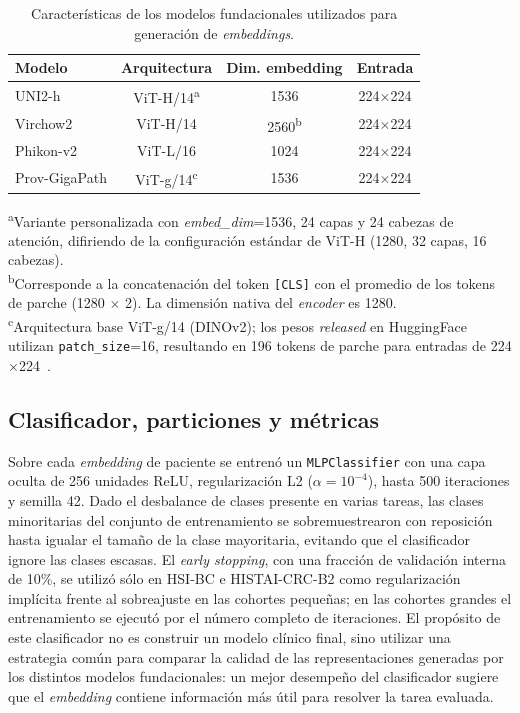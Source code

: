 \begin{table}[h]
\centering
\caption{Características de los modelos fundacionales utilizados para generación de \textit{embeddings}.}
\label{tab:embedding_models}
\begin{tabular}{lccc}
\hline
\textbf{Modelo} & \textbf{Arquitectura} & \textbf{Dim. embedding} & \textbf{Entrada} \\
\hline
UNI2-h        & ViT-H/14\textsuperscript{a} & 1536 & 224$\times$224 \\
Virchow2      & ViT-H/14 & 2560\textsuperscript{b} & 224$\times$224 \\
Phikon-v2     & ViT-L/16 & 1024 & 224$\times$224 \\
Prov-GigaPath & ViT-g/14\textsuperscript{c} & 1536 & 224$\times$224 \\
\hline
\end{tabular}

\begin{flushleft}
\footnotesize
\textsuperscript{a}Variante personalizada con \textit{embed\_dim}=1536, 24 capas y 24 cabezas de atención, difiriendo de la configuración estándar de ViT-H (1280, 32 capas, 16 cabezas).\\
\textsuperscript{b}Corresponde a la concatenación del token \texttt{[CLS]} con el promedio de los tokens de parche (1280 $\times$ 2). La dimensión nativa del \textit{encoder} es 1280.\\
\textsuperscript{c}Arquitectura base ViT-g/14 (DINOv2); los pesos \textit{released} en HuggingFace utilizan \texttt{patch\_size}=16, resultando en 196 tokens de parche para entradas de 224$\times$224~\parencite{xu2024provgigapath}.
\end{flushleft}
\end{table}

\subsection{Clasificador, particiones y métricas}
\label{sec:clasificador_particiones_metricas}

Sobre cada \textit{embedding} de paciente se entrenó un \texttt{MLPClassifier} con una capa oculta de 256 unidades ReLU, regularización L2 ($\alpha=10^{-4}$), hasta 500 iteraciones y semilla 42. Dado el desbalance de clases presente en varias tareas, las clases minoritarias del conjunto de entrenamiento se sobremuestrearon con reposición hasta igualar el tamaño de la clase mayoritaria, evitando que el clasificador ignore las clases escasas. El \textit{early stopping}, con una fracción de validación interna de 10\%, se utilizó sólo en HSI-BC e HISTAI-CRC-B2 como regularización implícita frente al sobreajuste en las cohortes pequeñas; en las cohortes grandes el entrenamiento se ejecutó por el número completo de iteraciones. El propósito de este clasificador no es construir un modelo clínico final, sino utilizar una estrategia común para comparar la calidad de las representaciones generadas por los distintos modelos fundacionales: un mejor desempeño del clasificador sugiere que el \textit{embedding} contiene información más útil para resolver la tarea evaluada.

